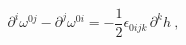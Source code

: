 \begin{equation}
\partial ^{i}\omega ^{0j}-\partial ^{j}\omega ^{0i}=-\frac{1}{2}\epsilon
_{0ijk}{}\,\partial ^{k}h\ ,
\end{equation}%

